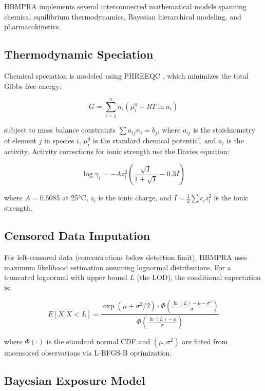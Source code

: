 \documentclass[11pt,a4paper]{article}
\begin{document}
HBMPRA implements several interconnected mathematical models spanning chemical equilibrium thermodynamics, Bayesian hierarchical modeling, and pharmacokinetics.

\subsection{Thermodynamic Speciation}

Chemical speciation is modeled using PHREEQC \citep{Parkhurst:1999}, which minimizes the total Gibbs free energy:

\begin{equation}
G = \sum_{i=1}^{n} n_i \left( \mu_i^0 + RT \ln a_i \right)
\end{equation}

subject to mass balance constraints $\sum a_{ij} n_i = b_j$, where $a_{ij}$ is the stoichiometry of element $j$ in species $i$, $\mu_i^0$ is the standard chemical potential, and $a_i$ is the activity. Activity corrections for ionic strength use the Davies equation:

\begin{equation}
\log \gamma_i = -A z_i^2 \left( \frac{\sqrt{I}}{1 + \sqrt{I}} - 0.3 I \right)
\end{equation}

where $A = 0.5085$ at 25°C, $z_i$ is the ionic charge, and $I = \frac{1}{2}\sum c_i z_i^2$ is the ionic strength.

\subsection{Censored Data Imputation}

For left-censored data (concentrations below detection limit), HBMPRA uses maximum likelihood estimation assuming lognormal distributions. For a truncated lognormal with upper bound $L$ (the LOD), the conditional expectation is:

\begin{equation}
E[X | X < L] = \frac{\exp(\mu + \sigma^2/2) \cdot \Phi\left(\frac{\ln(L) - \mu - \sigma^2}{\sigma}\right)}{\Phi\left(\frac{\ln(L) - \mu}{\sigma}\right)}
\label{eq:censored}
\end{equation}

where $\Phi(\cdot)$ is the standard normal CDF and $(\mu, \sigma^2)$ are fitted from uncensored observations via L-BFGS-B optimization.

\subsection{Bayesian Exposure Model}
\end{document}
